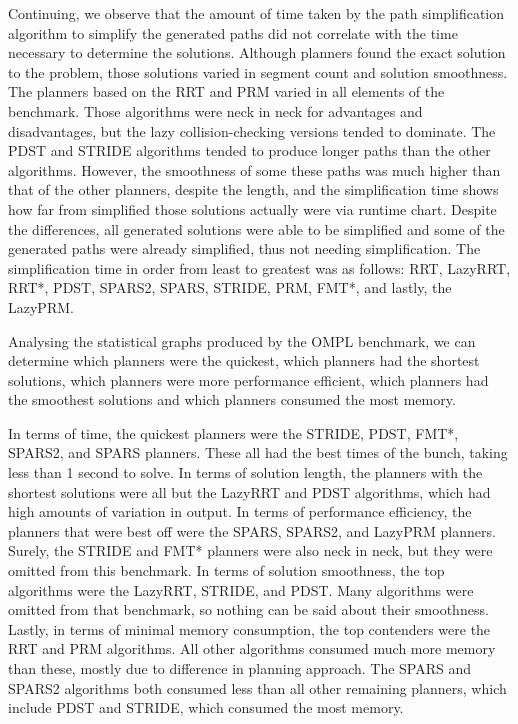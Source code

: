 \documentclass[conference]{IEEEtran} \usepackage[T1]{fontenc} \usepackage[backend=biber, style=ieee]{biblatex}
\begin{document}
Continuing, we observe that the amount of time taken by the path simplification algorithm to simplify the generated paths did not correlate with the time necessary to determine
the solutions. Although planners found the exact solution to the problem, those solutions varied in segment count and solution smoothness. The planners based on the RRT
and PRM varied in all elements of the benchmark. Those algorithms were neck in neck for advantages and disadvantages, but the lazy collision-checking versions tended to dominate. 
The PDST and STRIDE algorithms tended to produce longer paths than the other algorithms. However, the smoothness of some these paths was much higher than that of the other 
planners, despite the length, and the simplification time shows how far from simplified those solutions actually were via runtime chart. Despite the differences, all generated 
solutions were able to be simplified and some of the generated paths were already simplified, thus not needing simplification. The simplification time in order from least to greatest was as follows: RRT, LazyRRT, RRT*, PDST, SPARS2, SPARS, STRIDE, PRM, FMT*, and lastly, the LazyPRM. 

Analysing the statistical graphs produced by the OMPL benchmark, we can determine which planners were the quickest, which planners had the shortest solutions, which planners
were more performance efficient, which planners had the smoothest solutions and which planners consumed the most memory.

In terms of time, the quickest planners were the STRIDE, PDST, FMT*, SPARS2, and SPARS planners. These all had the best times of the bunch, taking less than 1 second to solve.
In terms of solution length, the planners with the shortest solutions were all but the LazyRRT and PDST algorithms, which had high amounts of variation in output. In terms of
performance efficiency, the planners that were best off were the SPARS, SPARS2, and LazyPRM planners. Surely, the STRIDE and FMT* planners were also neck in neck, but they were
omitted from this benchmark. In terms of solution smoothness, the top algorithms were the LazyRRT, STRIDE, and PDST. Many algorithms were omitted from that benchmark,
so nothing can be said about their smoothness. Lastly, in terms of minimal memory consumption, the top contenders were the RRT and PRM algorithms. All other algorithms 
consumed much more memory than these, mostly due to difference in planning approach. The SPARS and SPARS2 algorithms both consumed less than all other remaining planners, which
include PDST and STRIDE, which consumed the most memory.
\end{document}
